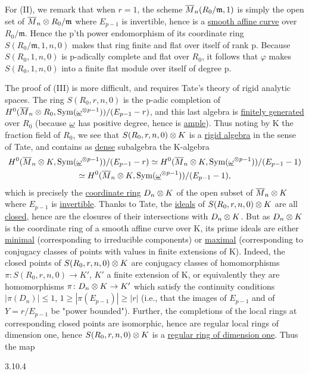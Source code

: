 \begin{kaproof}
For (II), we remark that when $r=1$, the scheme
$\overline{M}_n(R_0/\mathfrak{m},1)$ is simply the open set of
$\overline{M}_n\otimes R_0/\mathfrak{m}$ where $E_{p-1}$ is invertible, hence is a
\uline{smooth affine curve} over $R_0/\mathfrak{m}$. Hence the p'th power
endomorphism of its coordinate ring $S(R_0/\mathfrak{m},1,n,0)$ makes that ring
finite and flat over itself of rank p. Because $S(R_0,1,n,0)$ is p-adically
complete and flat over $R_0$, it follows that $\varphi$ makes $S(R_0,1,n,0)$
into a finite flat module over itself of degree p.

The proof of (III) is more difficult, and requires Tate's theory of rigid
analytic spaces. The ring $S(R_0,r,n,0)$ is the p-adic completion of
$H^0(\overline{M}_n\otimes R_0,\operatorname{Sym}(\underline{\omega}^{\otimes p-1}))/(E_{p-1}-r)$, and this last
algebra is \uline{finitely generated} over $R_0$ (because $\underline{\omega}$ has positive
degree, hence is \uline{ample}). Thus noting by K the fraction field of $R_0$,
we see that $S(R_0,r,n,0)\otimes K$ is a \uline{rigid algebra} in the sense of
Tate, and contains as \uline{dense} subalgebra the K-algebra
\[
\begin{gathered}
H^0(\overline{M}_n\otimes K,\operatorname{Sym}(\underline{\omega}^{\otimes p-1}))/(E_{p-1}-r) \simeq
H^0(\overline{M}_n\otimes K,\operatorname{Sym}(\underline{\omega}^{\otimes p-1}))/(E_{p-1}-1)\\
\simeq
H^0(\overline{M}_n\otimes K,\operatorname{Sym}(\underline{\omega}^{\otimes p-1}))/(E_{p-1}-1),
\end{gathered}
\]
which is precisely the \uline{coordinate ring} $D_n\otimes K$ of the open subset
of $\overline{M}_n\otimes K$ where $E_{p-1}$ is \uline{invertible}. Thanks to Tate, the
\uline{ideals} of $S(R_0,r,n,0)\otimes K$ are all \uline{closed}, hence are the
closures of their intersections with $D_n\otimes K$. But as $D_n\otimes K$ is the
coordinate ring of a smooth affine curve over K, its prime ideals are either
\uline{minimal} (corresponding to irreducible components) or \uline{maximal}
(corresponding to conjugacy classes of points with values in finite extensions
of K). Indeed, the closed points of $S(R_0,r,n,0)\otimes K$ are conjugacy
classes of homomorphisms $\pi\colon S(R_0,r,n,0)\to K'$, $K'$ a finite
extension of K, or equivalently they are homomorphisms
$\pi\colon D_n\otimes K\to K'$ which satisfy the continuity conditions
$|\pi(D_n)|\leq 1$, $1\geq|\pi(E_{p-1})|\geq|r|$ (i.e., that the images of
$E_{p-1}$ and of $Y = r/E_{p-1}$ be "power bounded"). Further, the completions
of the local rings at corresponding closed points are isomorphic, hence are
regular local rings of dimension one, hence $S(R_0,r,n,0)\otimes K$ is a
\uline{regular ring of dimension one}. Thus the map
\begin{kadispb}{3.10.4}

\end{kadispb}
\end{kaproof}
